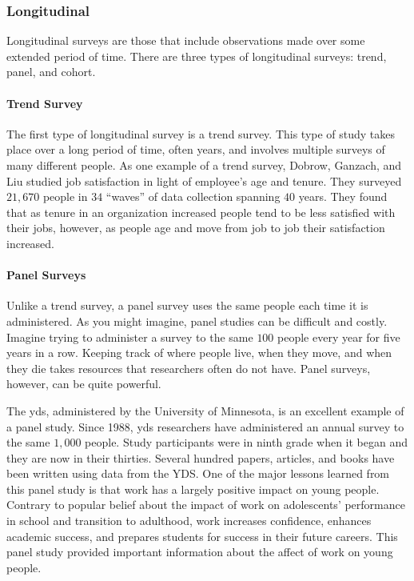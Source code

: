 \subsubsection{Longitudinal}

Longitudinal surveys are those that include observations made over some extended period of time. There are three types of longitudinal surveys: trend, panel, and cohort.

\paragraph{Trend Survey}

The first type of longitudinal survey is a trend survey. This type of study takes place over a long period of time, often years, and involves multiple surveys of many different people. As one example of a trend survey, Dobrow, Ganzach, and Liu\cite{dobrow2015time} studied job satisfaction in light of employee's age and tenure. They surveyed $ 21,670 $ people in $ 34 $ ``waves'' of data collection spanning $ 40 $ years. They found that as tenure in an organization increased people tend to be less satisfied with their jobs, however, as people age and move from job to job their satisfaction increased.

\paragraph{Panel Surveys}

Unlike a trend survey, a panel survey uses the same people each time it is administered. As you might imagine, panel studies can be difficult and costly. Imagine trying to administer a survey to the same $ 100 $ people every year for five years in a row. Keeping track of where people live, when they move, and when they die takes resources that researchers often do not have. Panel surveys, however, can be quite powerful. 

The \gls{yds}\cite{uminn2018youth}, administered by the University of Minnesota, is an excellent example of a panel study. Since 1988, \gls{yds} researchers have administered an annual survey to the same $ 1,000 $ people. Study participants were in ninth grade when it began and they are now in their thirties. Several hundred papers, articles, and books have been written using data from the YDS. One of the major lessons learned from this panel study is that work has a largely positive impact on young people. Contrary to popular belief about the impact of work on adolescents' performance in school and transition to adulthood, work increases confidence, enhances academic success, and prepares students for success in their future careers. This panel study provided important information about the affect of work on young people.


